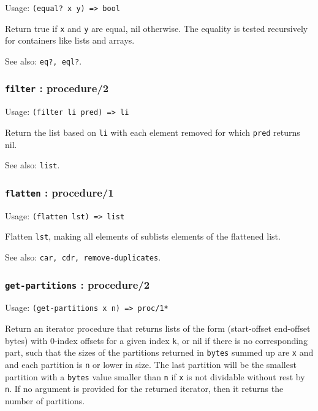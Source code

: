 \documentclass[
]{article}
\newcommand{\passthrough}[1]{#1}
\begin{document}
Usage: \passthrough{\lstinline!(equal? x y) => bool!}

Return true if \passthrough{\lstinline!x!} and
\passthrough{\lstinline!y!} are equal, nil otherwise. The equality is
tested recursively for containers like lists and arrays.

See also: \passthrough{\lstinline!eq?, eql?!}.

\hypertarget{filter-procedure2}{%
\subsubsection{\texorpdfstring{\texttt{filter} :
procedure/2}{filter : procedure/2}}\label{filter-procedure2}}

Usage: \passthrough{\lstinline!(filter li pred) => li!}

Return the list based on \passthrough{\lstinline!li!} with each element
removed for which \passthrough{\lstinline!pred!} returns nil.

See also: \passthrough{\lstinline!list!}.

\hypertarget{flatten-procedure1}{%
\subsubsection{\texorpdfstring{\texttt{flatten} :
procedure/1}{flatten : procedure/1}}\label{flatten-procedure1}}

Usage: \passthrough{\lstinline!(flatten lst) => list!}

Flatten \passthrough{\lstinline!lst!}, making all elements of sublists
elements of the flattened list.

See also: \passthrough{\lstinline!car, cdr, remove-duplicates!}.

\hypertarget{get-partitions-procedure2}{%
\subsubsection{\texorpdfstring{\texttt{get-partitions} :
procedure/2}{get-partitions : procedure/2}}\label{get-partitions-procedure2}}

Usage: \passthrough{\lstinline!(get-partitions x n) => proc/1*!}

Return an iterator procedure that returns lists of the form
(start-offset end-offset bytes) with 0-index offsets for a given index
\passthrough{\lstinline!k!}, or nil if there is no corresponding part,
such that the sizes of the partitions returned in
\passthrough{\lstinline!bytes!} summed up are
\passthrough{\lstinline!x!} and and each partition is
\passthrough{\lstinline!n!} or lower in size. The last partition will be
the smallest partition with a \passthrough{\lstinline!bytes!} value
smaller than \passthrough{\lstinline!n!} if \passthrough{\lstinline!x!}
is not dividable without rest by \passthrough{\lstinline!n!}. If no
argument is provided for the returned iterator, then it returns the
number of partitions.
\end{document}
